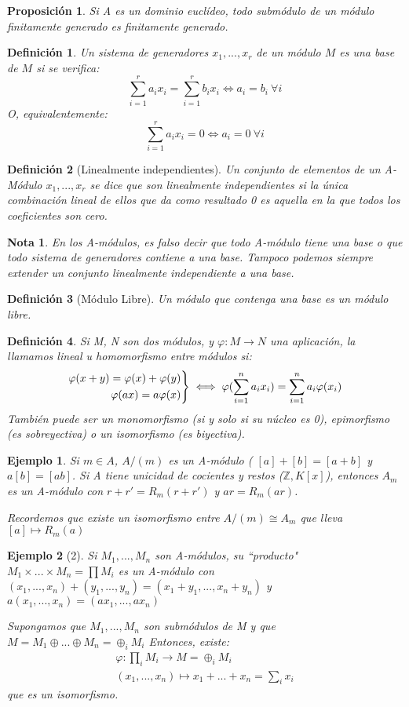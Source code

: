 \documentclass[11pt, a4paper, titlepage]{article}
\providecommand{\ent}{\mathbb{Z}}
\theoremstyle{theorem-style}
\newtheorem*{nprop}{Proposición}
\theoremstyle{definition-style}
\newtheorem*{ndef}{Definición}
\theoremstyle{remark-style}
\newtheorem*{nota}{Nota}
\theoremstyle{example-style}
\newtheorem*{ejemplo}{Ejemplo}
\newenvironment{rcases}
  {\left.\begin{aligned}}
  {\end{aligned}\right\rbrace}
\begin{document}
\begin{nprop}
	Si A es un dominio euclídeo, todo submódulo de un módulo finitamente generado es finitamente generado.
\end{nprop}
\begin{ndef}
	Un sistema de generadores $x_1,...,x_r$ de un módulo $M$ es una base de $M$ si se verifica:
	\[
	\sum_{i=1}^r a_i x_i = \sum_{i=1}^r b_i x_i \iff a_i = b_i \ \forall i
	\]
	O, equivalentemente:
	\[
	\sum_{i=1}^r a_ix_i = 0 \iff a_i  = 0  \ \forall i
	\]
\end{ndef}
\begin{ndef}[Linealmente independientes]
	Un conjunto de elementos de un A-Módulo $x_1,...,x_r$ se dice que son linealmente independientes si la única combinación lineal de ellos que da como resultado 0 es aquella en la que todos los coeficientes son cero.
\end{ndef}
\begin{nota}
	En los A-módulos, es falso decir que todo A-módulo tiene una base o que todo sistema de generadores contiene a una base. Tampoco podemos siempre extender un conjunto linealmente independiente a una base.
\end{nota}
\begin{ndef}[Módulo Libre]
	Un módulo que contenga una base es un módulo libre.
\end{ndef}

\begin{ndef}
	Si M, N son dos módulos, y $\varphi:M \to N$ una aplicación, la llamamos lineal u homomorfismo entre módulos si:
	\[
	\begin{rcases}
	\varphi(x+y) = \varphi(x) + \varphi(y)\\
	\varphi(ax) = a\varphi(x)
\end{rcases} \iff \varphi(\sum_{i=1}^n a_ix_i) = \sum_{i=1}^n a_i \varphi(x_i)
	\]
	También puede ser un monomorfismo (si y solo si su núcleo es 0), epimorfismo (es sobreyectiva) o un isomorfismo (es biyectiva).
\end{ndef}
\begin{ejemplo}
	Si $m\in A$, $A/(m)$ es un A-módulo ( $[a]+[b] = [a+b]$ y $a[b] = [ab]$. Si A tiene unicidad de cocientes y restos ($\ent,K[x]$), entonces $A_m$ es un A-módulo con $r+r' = R_m(r+r')$ y $ar = R_m(ar)$.
	
	Recordemos que existe un isomorfismo entre $A/(m) \cong A_m$ que lleva $[a] \mapsto R_m(a)$
\end{ejemplo}

\begin{ejemplo}[2]
	Si $M_1,...,M_n$ son A-módulos, su “producto" $M_1 \times ... \times M_n =  \prod M_i$ es un A-módulo con $(x_1,...,x_n) + (y_1,...,y_n) = (x_1+y_1,...,x_n+y_n)$  y $a(x_1,...,x_n)= (ax_1,...,ax_n)$
	
		Supongamos que $M_1,...,M_n$ son submódulos de M y que $M = M_1 \oplus ... \oplus M_n = \oplus_i M_i$
	Entonces, existe:
	\begin{align}
	\varphi:\prod_i M_i \to M=\oplus_i M_i \\
	(x_1,...,x_n) \mapsto x_1+...+x_n = \sum_i x_i
\end{align}
que es un isomorfismo.
\end{ejemplo}
\end{document}
